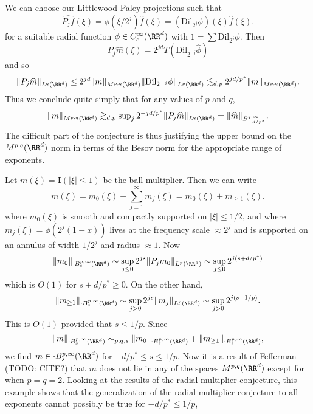 

\begin{remark}
    We can choose our Littlewood-Paley projections such that
    \[ \widehat{P_j f}(\xi) = \phi(\xi / 2^j) \widehat{f}(\xi) = (\text{Dil}_{2^j} \phi)(\xi) \widehat{f}(\xi). \]
    for a suitable radial function $\phi \in C_c^\infty(\RR^d)$ with $1 = \sum \text{Dil}_{2^j} \phi$. Then
    \[ P_j \widehat{m}(\xi) = 2^{jd} T(\text{Dil}_{2^{-j}} \widehat{\phi}) \]
    and so
    \[ \| P_j \widehat{m} \|_{L^q(\RR^d)} \leq 2^{jd} \| m \|_{M^{p,q}(\RR^d)} \| \text{Dil}_{2^{-j}} \phi \|_{L^p(\RR^d)} \lesssim_{d,p} 2^{jd/p^*} \| m \|_{M^{p,q}(\RR^d)}. \]
    Thus we conclude quite simply that for any values of $p$ and $q$,
    \[ \| m \|_{M^{p,q}(\RR^d)} \gtrsim_{d,p} \sup\nolimits_j 2^{-jd/p^*} \| P_j \widehat{m} \|_{L^q(\RR^d)} = \| \widehat{m} \|_{\dot{B}_{-d/p^*}^{q,\infty}}. \]
    The difficult part of the conjecture is thus justifying the upper bound on the $M^{p,q}(\RR^d)$ norm in terms of the Besov norm for the appropriate range of exponents.
\end{remark}

\begin{remark}
    Let $m(\xi) = \mathbf{I}(|\xi| \leq 1)$ be the ball multiplier. Then we can write
    \[ m(\xi) = m_0(\xi) + \sum_{j = 1}^\infty m_j(\xi) = m_0(\xi) + m_{\geq 1}(\xi). \]
    where $m_0(\xi)$ is smooth and compactly supported on $|\xi| \leq 1/2$, and where $m_j(\xi) = \phi(2^j (1 - x))$ lives at the frequency scale $\approx 2^j$ and is supported on an annulus of width $1/2^j$ and radius $\approx 1$.    Now
    \[ \| m_0 \|_{\cdot{B}^{p,\infty}_s(\RR^d)} \sim \sup_{j \leq 0} 2^{js} \| P_j m_0 \|_{L^p(\RR^d)} \sim \sup_{j \leq 0} 2^{j(s + d/p^*)} \]
    which is $O(1)$ for $s + d/p^* \geq 0$. On the other hand,
    \[ \| m_{\geq 1} \|_{\cdot{B}^{p,\infty}_s(\RR^d)} \sim \sup_{j > 0} 2^{js} \| m_j \|_{L^p(\RR^d)} \sim \sup_{j > 0} 2^{j(s - 1/p)}. \]
    This is $O(1)$ provided that $s \leq 1/p$. Since
    \[ \| m \|_{\cdot{B}^{p,\infty}_s(\RR^d)} \sim_{p,q,s} \| m_0 \|_{\cdot{B}^{p,\infty}_s(\RR^d)} + \| m_{\geq 1} \|_{\cdot{B}^{p,\infty}_s(\RR^d)}, \]
    we find $m \in \cdot{B}^{p,\infty}_s(\RR^d)$ for $-d/p^* \leq s \leq 1/p$. Now it is a result of Fefferman (TODO: CITE?) that $m$ does not lie in any of the spaces $M^{p,q}(\RR^d)$ except for when $p = q = 2$. Looking at the results of the radial multiplier conjecture, this example shows that the generalization of the radial multiplier conjecture to all exponents cannot possibly be true for $-d/p^* \leq 1/p$,
\end{remark}

